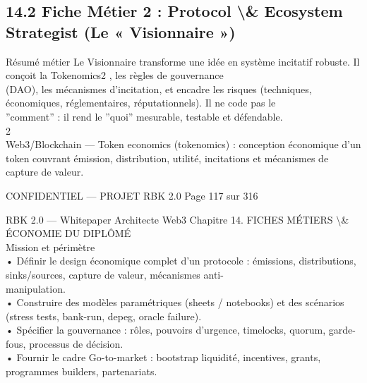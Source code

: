 \subsection{14.2 Fiche Métier 2 : Protocol \textbackslash{}& Ecosystem Strategist (Le « Visionnaire »)}
Résumé métier Le Visionnaire transforme une idée en système incitatif robuste. Il conçoit la Tokenomics2 , les règles de gouvernance\\
(DAO), les mécanismes d’incitation, et encadre les risques (techniques, économiques, réglementaires, réputationnels). Il ne code pas le\\
”comment” : il rend le ”quoi” mesurable, testable et défendable.\\
2\\
Web3/Blockchain — Token economics (tokenomics) : conception économique d’un token couvrant émission, distribution, utilité, incitations et mécanismes de\\
capture de valeur.\\
\vspace{0.5em}
\vspace{0.5em}
\vspace{0.5em}
\vspace{0.5em}
\begin{confidential}CONFIDENTIEL — PROJET RBK 2.0                                       Page 117 sur 316\end{confidential}
RBK 2.0 — Whitepaper Architecte Web3                                              Chapitre 14. FICHES MÉTIERS \textbackslash{}& ÉCONOMIE DU DIPLÔMÉ\\
\vspace{0.5em}
\vspace{0.5em}
Mission et périmètre\\
\vspace{0.5em}
• Définir le design économique complet d’un protocole : émissions, distributions, sinks/sources, capture de valeur, mécanismes anti-\\
manipulation.\\
\vspace{0.5em}
• Construire des modèles paramétriques (sheets / notebooks) et des scénarios (stress tests, bank-run, depeg, oracle failure).\\
\vspace{0.5em}
• Spécifier la gouvernance : rôles, pouvoirs d’urgence, timelocks, quorum, garde-fous, processus de décision.\\
\vspace{0.5em}
• Fournir le cadre Go-to-market : bootstrap liquidité, incentives, grants, programmes builders, partenariats.\\
